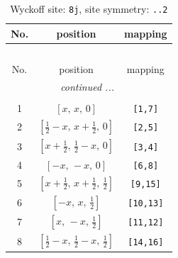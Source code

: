 \documentclass[fleqn,8pt]{jsarticle}
\begin{document}
\begin{longtable}{ccc}
\caption{Wyckoff site: {\tt 8j}, site symmetry: {\tt ..2}}
 \\
 \hline \hline
No. & position & mapping \\ \hline \endfirsthead

\multicolumn{2}{l}{\tablename\ \thetable{}} \\
 \hline \hline
No. & position & mapping \\ \hline \endhead

 \hline \hline
\multicolumn{2}{r}{\footnotesize\it continued ...} \\ \endfoot

 \hline \hline
\multicolumn{2}{r}{} \\ \endlastfoot

1 & $\left[ x,\, x,\, 0 \right]$ & {\tt [1,7]} \\ \hline
2 & $\left[ \frac{1}{2} - x,\, x + \frac{1}{2},\, 0 \right]$ & {\tt [2,5]} \\ \hline
3 & $\left[ x + \frac{1}{2},\, \frac{1}{2} - x,\, 0 \right]$ & {\tt [3,4]} \\ \hline
4 & $\left[ - x,\, - x,\, 0 \right]$ & {\tt [6,8]} \\ \hline
5 & $\left[ x + \frac{1}{2},\, x + \frac{1}{2},\, \frac{1}{2} \right]$ & {\tt [9,15]} \\ \hline
6 & $\left[ - x,\, x,\, \frac{1}{2} \right]$ & {\tt [10,13]} \\ \hline
7 & $\left[ x,\, - x,\, \frac{1}{2} \right]$ & {\tt [11,12]} \\ \hline
8 & $\left[ \frac{1}{2} - x,\, \frac{1}{2} - x,\, \frac{1}{2} \right]$ & {\tt [14,16]} \\
\end{longtable}
\renewcommand{\arraystretch}{1.2}
\end{document}
